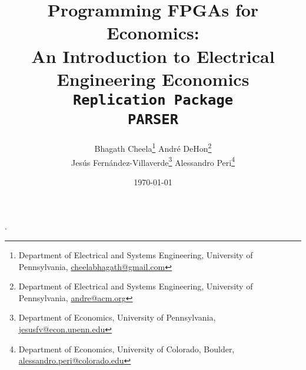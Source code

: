 \documentclass[12pt,american]{article}
\makeatletter
\newcommand{\resultsfolder}{./results}
\newcommand{\baselinespeedupFPGAICPUI}{\@\xspace}
\newcommand{\cpuItimehoursminutes}{ hours\@\xspace}
\newcommand{\fpgaItimehoursminutes}{ minutes\@\xspace}
\makeatother
\begin{document}
\title{Programming FPGAs for Economics:\\
\vspace{0.1in}
An Introduction to Electrical Engineering Economics \\
\vspace{0.1in}
\texttt{Replication Package} \\ \texttt{PARSER}}

\author{Bhagath Cheela\thanks{Department of Electrical and Systems Engineering, University of Pennsylvania, \textcolor{blue}{\href{mailto:cheelabhagath@gmail.com}{cheelabhagath@gmail.com}}}
\hspace{2cm}
Andr\'e DeHon\thanks{Department of Electrical and Systems Engineering, University of Pennsylvania, \textcolor{blue}{\href{mailto:andre@acm.org}{andre@acm.org}}}\\
\hspace{-1cm}Jes\'us Fern\'andez-Villaverde\thanks{Department of Economics, University of Pennsylvania, \textcolor{blue}{\href{mailto:jesusfv@econ.upenn.edu}{jesusfv@econ.upenn.edu}}}
\hspace{0.6cm}
Alessandro Peri\thanks{Department of Economics, University of Colorado, Boulder,
\textcolor{blue}{\href{mailto:alessandro.peri@colorado.edu}{alessandro.peri@colorado.edu}}}}

\date{\today} 


.

\maketitle

%
\end{document}
